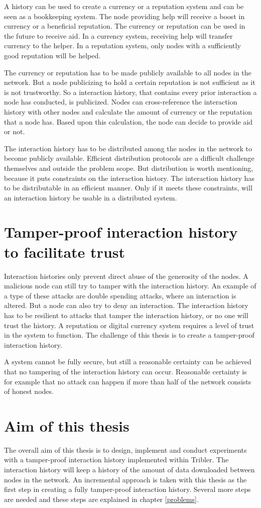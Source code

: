 A history can be used to create a currency or a reputation system
and can be seen as a bookkeeping system.
The node providing help will receive a boost in currency or a beneficial reputation.
The currency or reputation can be used in the future to receive aid.
In a currency system, receiving help will transfer currency to the helper.
In a reputation system, only nodes with a sufficiently good reputation will be helped.

The currency or reputation has to be made publicly available to all nodes in the network.
But a node publicizing to hold a certain reputation is not sufficient as it is not trustworthy.
So a interaction history, that contains every prior interaction a node has conducted, is publicized.
Nodes can cross-reference the interaction history with other nodes and calculate the amount of currency 
or the reputation that a node has.
Based upon this calculation, the node can decide to provide aid or not.

The interaction history has to be distributed among the nodes in the network
to become publicly available.
Efficient distribution protocols are a difficult challenge themselves and outside the problem scope.
But distribution is worth mentioning, because it puts constraints on the interaction history.
The interaction history has to be distributable in an efficient manner.
Only if it meets these constraints, will an interaction history be usable in a distributed system.

\section{Tamper-proof interaction history to facilitate trust}
Interaction histories only prevent direct abuse of the generosity of the nodes.
A malicious node can still try to tamper with the interaction history.
An example of a type of these attacks are double spending attacks\cite{Nakamoto-bitcoin},
where an interaction is altered.
But a node can also try to deny an interaction.
The interaction history has to be resilient to attacks that tamper the interaction history, 
or no one will trust the history. 
A reputation or digital currency system requires a level of trust in the system to function.
The challenge of this thesis is to create a tamper-proof interaction history.

A system cannot be fully secure, 
but still a reasonable certainty can be achieved that no tampering of the interaction history can occur.
Reasonable certainty is for example that no attack can happen 
if more than half of the network consists of honest nodes.

\section{Aim of this thesis}
\label{pb-aim}
The overall aim of this thesis is to design, implement and conduct experiments with a tamper-proof interaction history
implemented within Tribler.
The interaction history will keep a history of the amount of data downloaded between nodes in the network.
An incremental approach is taken with this thesis as the first step in creating a fully tamper-proof interaction history.
Several more steps are needed and these steps are explained in chapter \ref{problems}.
